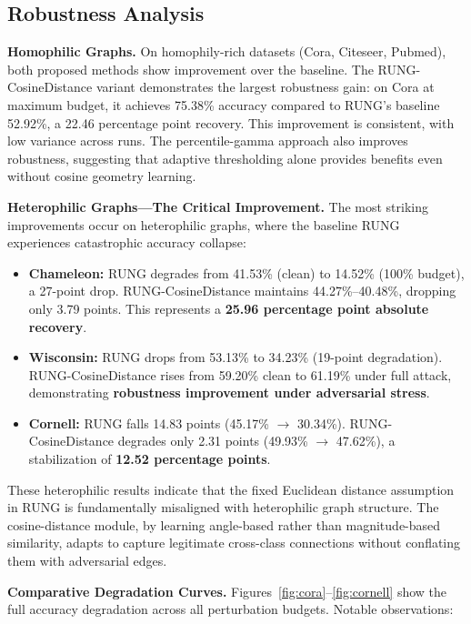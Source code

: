 \documentclass[sigconf]{acmart}
\begin{document}
\FloatBarrier

\subsection{Robustness Analysis}

\textbf{Homophilic Graphs.} On homophily-rich datasets (Cora, Citeseer, Pubmed), both proposed methods show improvement over the baseline. The RUNG-CosineDistance variant demonstrates the largest robustness gain: on Cora at maximum budget, it achieves 75.38\% accuracy compared to RUNG's baseline 52.92\%, a 22.46 percentage point recovery. This improvement is consistent, with low variance across runs. The percentile-gamma approach also improves robustness, suggesting that adaptive thresholding alone provides benefits even without cosine geometry learning.

\textbf{Heterophilic Graphs---The Critical Improvement.} The most striking improvements occur on heterophilic graphs, where the baseline RUNG experiences catastrophic accuracy collapse:

\begin{itemize}
\item \textbf{Chameleon:} RUNG degrades from 41.53\% (clean) to 14.52\% (100\% budget), a 27-point drop. RUNG-CosineDistance maintains 44.27\%--40.48\%, dropping only 3.79 points. This represents a \textbf{25.96 percentage point absolute recovery}.

\item \textbf{Wisconsin:} RUNG drops from 53.13\% to 34.23\% (19-point degradation). RUNG-CosineDistance rises from 59.20\% clean to 61.19\% under full attack, demonstrating \textbf{robustness improvement under adversarial stress}.

\item \textbf{Cornell:} RUNG falls 14.83 points (45.17\% $\to$ 30.34\%). RUNG-CosineDistance degrades only 2.31 points (49.93\% $\to$ 47.62\%), a stabilization of \textbf{12.52 percentage points}.
\end{itemize}

These heterophilic results indicate that the fixed Euclidean distance assumption in RUNG is fundamentally misaligned with heterophilic graph structure. The cosine-distance module, by learning angle-based rather than magnitude-based similarity, adapts to capture legitimate cross-class connections without conflating them with adversarial edges.

\textbf{Comparative Degradation Curves.} Figures~\ref{fig:cora}--\ref{fig:cornell} show the full accuracy degradation across all perturbation budgets. Notable observations:
\end{document}
